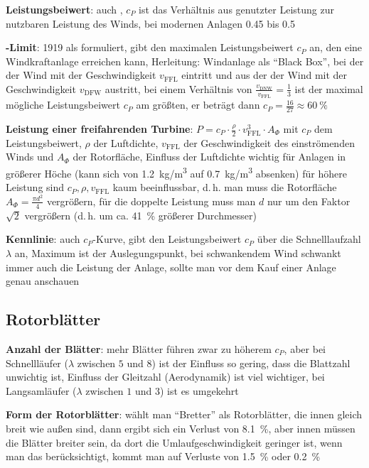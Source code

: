 \linie

\textbf{Leistungsbeiwert}:
auch , $c_P$ ist das Verhältnis aus genutzter Leistung zur nutzbaren Leistung
des Winds,
bei modernen Anlagen \num{0.45} bis \num{0.5}

\textbf{-Limit}:
1919 als  formuliert,
gibt den maximalen Leistungsbeiwert $c_P$ an, den eine Windkraftanlage erreichen kann,
Herleitung: Windanlage als "`Black Box"', bei der der Wind mit der Geschwindigkeit $v_{\text{FFL}}$
eintritt und aus der der Wind mit der Geschwindigkeit $v_{\text{DFW}}$ austritt, bei einem
Verhältnis von $\frac{v_{\text{DNW}}}{v_{\text{FFL}}} = \frac{1}{3}$ ist der maximal mögliche
Leistungsbeiwert $c_P$ am größten, er beträgt dann $c_P = \frac{16}{27} \approx \SI{60}{\percent}$

\textbf{Leistung einer freifahrenden Turbine}:
$P = c_P \cdot \frac{\rho}{2} \cdot v_{\text{FFL}}^3 \cdot A_\Phi$
mit $c_P$ dem Leistungsbeiwert,
$\rho$ der Luftdichte,
$v_{\text{FFL}}$ der Geschwindigkeit des einströmenden Winds und
$A_\Phi$ der Rotorfläche,
Einfluss der Luftdichte wichtig für Anlagen in größerer Höche
(kann sich von \SI{1.2}{\kilogram/\meter\cubed} auf \SI{0.7}{\kilogram/\meter\cubed} absenken)
für höhere Leistung sind $c_P, \rho, v_{\text{FFL}}$ kaum beeinflussbar, d.\,h.
man muss die Rotorfläche $A_\Phi = \frac{\pi d^2}{4}$ vergrößern,
für die doppelte Leistung muss man $d$ nur um den Faktor $\sqrt{2}$ vergrößern
(d.\,h. um ca. \SI{41}{\percent} größerer Durchmesser)

\textbf{Kennlinie}:
auch $c_P$-Kurve,
gibt den Leistungsbeiwert $c_P$ über die Schnelllaufzahl $\lambda$ an,
Maximum ist der Auslegungspunkt,
bei schwankendem Wind schwankt immer auch die Leistung der Anlage,
sollte man vor dem Kauf einer Anlage genau anschauen

\subsection{%
    Rotorblätter%
}

\textbf{Anzahl der Blätter}:
mehr Blätter führen zwar zu höherem $c_P$,
aber bei Schnellläufer ($\lambda$ zwischen $5$ und $8$) ist der Einfluss so gering,
dass die Blattzahl unwichtig ist, Einfluss der Gleitzahl (Aerodynamik) ist viel wichtiger,
bei Langsamläufer ($\lambda$ zwischen $1$ und $3$) ist es umgekehrt

\textbf{Form der Rotorblätter}:
wählt man "`Bretter"' als Rotorblätter, die innen gleich breit wie außen sind,
dann ergibt sich ein Verlust von \SI{8.1}{\percent},
aber innen müssen die Blätter breiter sein, da dort die Umlaufgeschwindigkeit geringer ist,
wenn man das berücksichtigt, kommt man auf Verluste von \SI{1.5}{\percent} oder \SI{0.2}{\percent}

